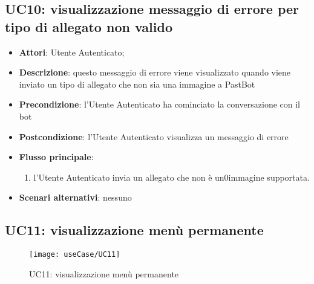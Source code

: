 
\subsection{UC10: visualizzazione messaggio di errore per tipo di allegato non
valido}
\label{uc:uc10}

\begin{itemize}
  \item \textbf{Attori}: Utente Autenticato;
  \item \textbf{Descrizione}: questo messaggio di errore viene visualizzato
quando viene inviato un tipo di allegato che non sia una immagine a PastBot
  \item \textbf{Precondizione}: l'Utente Autenticato ha cominciato la
conversazione con il bot
  \item \textbf{Postcondizione}: l'Utente Autenticato visualizza un messaggio
di errore
  \item \textbf{Flusso principale}:
  \begin{enumerate}
    \item l'Utente Autenticato invia un allegato che non è un0immagine
supportata.
  \end{enumerate}
  \item \textbf{Scenari alternativi}: nessuno
\end{itemize}


\newpage

\subsection{UC11: visualizzazione menù permanente}
\label{uc:uc11}

\begin{figure}[H]
  \centering
  \texttt{[image: useCase/UC11]}
  \caption{UC11: visualizzazione menù permanente}
\end{figure}

